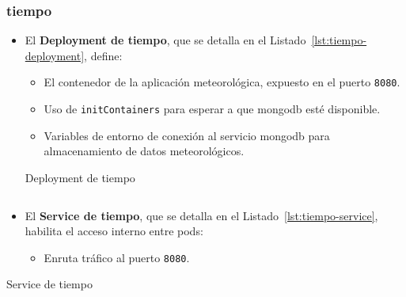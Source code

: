 \subsubsection*{tiempo}
\begin{itemize}
  \item El \textbf{Deployment de tiempo}, que se detalla en el Listado~\ref{lst:tiempo-deployment}, define:
  \begin{itemize}
    \item El contenedor de la aplicación meteorológica, expuesto en el puerto \texttt{8080}.
    \item Uso de \texttt{initContainers} para esperar a que \gls{mongodb} esté disponible.
    \item Variables de entorno de conexión al servicio \gls{mongodb} para almacenamiento de datos meteorológicos.
  \end{itemize}
  \begin{longlisting}
\caption{Deployment de tiempo}
\inputminted[firstline=302,lastline=330]{yaml}{../backend/despliegue/kubernetes/despliegue.yaml}
\label{lst:tiempo-deployment}
\end{longlisting}
  \item El \textbf{Service de tiempo}, que se detalla en el Listado~\ref{lst:tiempo-service}, habilita el acceso interno entre pods:
  \begin{itemize}
    \item Enruta tráfico al puerto \texttt{8080}.
  \end{itemize}
\end{itemize}



\begin{longlisting}
\caption{Service de tiempo}
\inputminted[firstline=332,lastline=342]{yaml}{../backend/despliegue/kubernetes/despliegue.yaml}
\label{lst:tiempo-service}
\end{longlisting}

